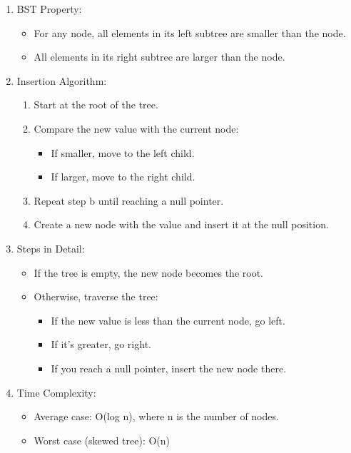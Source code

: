 \begin{enumerate}
\def\labelenumi{\arabic{enumi}.}
\tightlist
\item
  BST Property:

  \begin{itemize}
  \tightlist
  \item
    For any node, all elements in its left subtree are smaller than the
    node.
  \item
    All elements in its right subtree are larger than the node.
  \end{itemize}
\item
  Insertion Algorithm:

  \begin{enumerate}
  \def\labelenumii{\alph{enumii}.}
  \tightlist
  \item
    Start at the root of the tree.
  \item
    Compare the new value with the current node:

    \begin{itemize}
    \tightlist
    \item
      If smaller, move to the left child.
    \item
      If larger, move to the right child.
    \end{itemize}
  \item
    Repeat step b until reaching a null pointer.
  \item
    Create a new node with the value and insert it at the null position.
  \end{enumerate}
\item
  Steps in Detail:

  \begin{itemize}
  \tightlist
  \item
    If the tree is empty, the new node becomes the root.
  \item
    Otherwise, traverse the tree:

    \begin{itemize}
    \tightlist
    \item
      If the new value is less than the current node, go left.
    \item
      If it's greater, go right.
    \item
      If you reach a null pointer, insert the new node there.
    \end{itemize}
  \end{itemize}
\item
  Time Complexity:

  \begin{itemize}
  \tightlist
  \item
    Average case: O(log n), where n is the number of nodes.
  \item
    Worst case (skewed tree): O(n)
  \end{itemize}
\end{enumerate}

